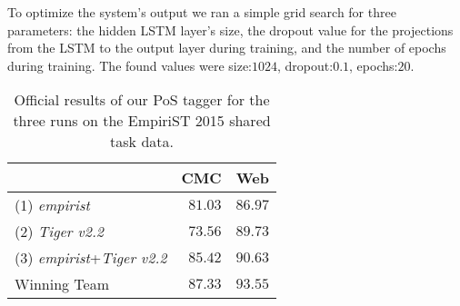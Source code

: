 \documentclass[11pt]{article}
\begin{document}
To optimize the system's output we ran a simple grid search for three
parameters: the hidden LSTM layer's size, the dropout value for the projections
from the LSTM to the output layer during training, and the number of epochs
during training. 
The found values were size:$1024$, dropout:$0.1$, epochs:$20$.

\begin{table}[h]
\begin{center}
\begin{tabular}{l|r|r}
\hline
\multicolumn{1}{c}{} & \multicolumn{1}{c}{CMC} & \multicolumn{1}{c}{Web} \\ \hline
(1) \emph{empirist}             & $81.03$       & $86.97$ \\ \hline
(2) \emph{Tiger v2.2}           & $73.56$       & $89.73$ \\ \hline
(3) \emph{empirist}+\emph{Tiger v2.2} & $85.42$ & $90.63$ \\ \hline\hline
Winning Team                    & $87.33$       & $93.55$ \\ \hline
\end{tabular}
\end{center}
\caption{\label{tab:results}Official results of our PoS tagger for the three
runs on the EmpiriST 2015 shared task data.
} 
\end{table}


\end{document}
